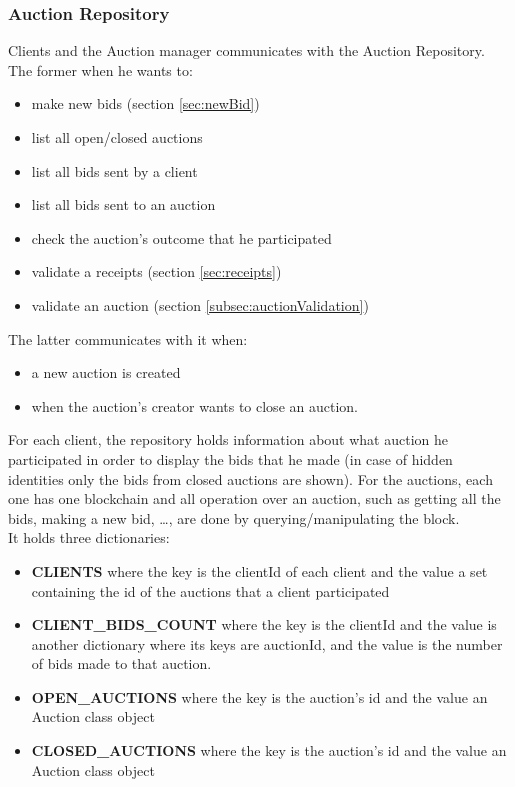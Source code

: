 \documentclass[12pt]{article}
\begin{document}
\subsubsection{Auction Repository}
Clients and the Auction manager communicates with the Auction Repository. The former when he
  wants to:
\begin{itemize}
  \item make new bids (section \ref{sec:newBid})
    \item list all open/closed auctions
    \item list all bids sent by a client
    \item list all bids sent to an auction
    \item check the auction's outcome that he participated
    \item validate a receipts (section \ref{sec:receipts})
    \item validate an auction (section \ref{subsec:auctionValidation})
\end{itemize}
The latter communicates with it when:
\begin{itemize} 
  \item a new auction is created
  \item when the auction's creator wants to close an auction. \\
\end{itemize}
For each client, the repository holds information about what auction he participated in order to display
  the bids that he made (in case of hidden identities only the bids from closed auctions are shown).
  For the auctions, each one has one blockchain and all operation over an auction, such as getting all
  the bids, making a new bid, \ldots, are done by querying/manipulating the block. \\
It holds three dictionaries:
\begin{itemize}
  \item \textbf{CLIENTS} where the key is the clientId of each client and the value a set containing
    the id of the auctions that a client participated
  \item \textbf{CLIENT\_BIDS\_COUNT} where the key is the clientId and the value is another dictionary where its keys are auctionId, and the value is
  the number of bids made to that auction.
  \item \textbf{OPEN\_AUCTIONS} where the key is  the auction's id and the value an Auction class object
  \item \textbf{CLOSED\_AUCTIONS} where the key is the auction's id and the value an Auction class object
\end{itemize}
\end{document}
